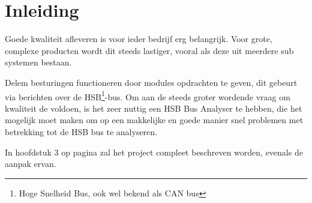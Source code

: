 \section{Inleiding}

Goede kwaliteit afleveren is voor ieder bedrijf erg belangrijk. Voor grote, complexe producten wordt dit steeds lastiger, vooral als deze uit meerdere sub systemen bestaan.

Delem besturingen functioneren door modules opdrachten te geven, dit gebeurt via berichten over de HSB\footnote{Hoge Snelheid Bus, ook wel bekend als CAN bus}-bus.  Om aan de steeds groter wordende vraag om kwaliteit de voldoen, is het zeer nuttig een HSB Bus Analyser te hebben, die het mogelijk moet maken om op een makkelijke en goede manier snel problemen met betrekking tot de HSB bus te analyseren.

In hoofdstuk 3 op pagina \pageref{project} zal het project compleet beschreven worden, evenals de aanpak ervan.
